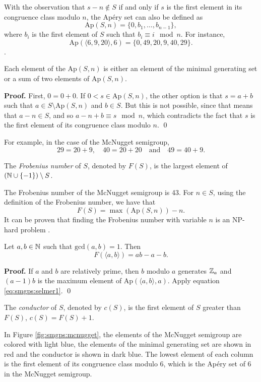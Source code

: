 With the observation that $s - n \notin S$ if and only if $s$ is the first element in its congruence class modulo $n$, the Apéry set can also be defined as  
\[\text{Ap}(S, n) =  \{0, b_1, \ldots, b_{n - 1}\},\]
where $b_i$ is the first element of $S$ such that \(b_i \equiv i \mod n\). 
For instance, \[\text{Ap}(\langle 6, 9, 20 \rangle, 6) = \{0, 49, 20, 9, 40, 29\}.\]. 
\begin{proposition}
    Each element of the $\text{Ap}(S, n)$ is either an element of the minimal generating set or a sum of two elements of $\text{Ap}(S, n)$. 
\end{proposition}
\textbf{Proof. } First, $0 = 0 + 0$. If $0 < s \in \text{Ap}(S, n)$, the other option is that $s = a + b$ such that $a \in S\setminus\text{Ap}(S, n)$ and $b \in S$. But this is not possible, since that means that $a - n \in S$, and so $a - n + b \equiv s \mod n$, which contradicts the fact that $s$ is the first element of its congruence class modulo $n$. \qed \par  
For example, in the case of the McNugget semigroup,
\[29 = 20 + 9, \quad 40 = 20 + 20 \quad \text{and} \quad 49 = 40 + 9.\]
\begin{definition}\label{def:smgps:frobeniusnum}
    The \textit{Frobenius number} of $S$, denoted by $F(S)$, is the largest element of $(\mathbb{N} \cup \{-1\}) \setminus S$.
\end{definition}

The Frobenius number of the McNugget semigroup is 43. For $n \in S$, using the definition of the Frobenius number, we have that
\begin{equation}\label{eq:smgps:selmer1}
    F(S) = \max (\text{Ap}(S, n)) - n.
\end{equation}
It can be proven that finding the Frobenius number with variable $n$ is an NP-hard problem \cite{ramirez1996complexity}.

\begin{proposition} Let $a, b \in \mathbb{N}$ such that $\text{gcd}(a, b) = 1$. Then 
    \[F(\langle a, b \rangle) = ab - a - b.\] 
\end{proposition}
\textbf{Proof. } If $a$ and $b$ are relatively prime, then $b$ modulo $a$ generates $\mathbb{Z}_a$ and $(a - 1)b$ is the maximum element of $\text{Ap}(\langle a, b\rangle, a)$. Apply equation \ref{eq:smgps:selmer1}. \qed

\begin{definition}
    The \textit{conductor} of $S$, denoted by $c(S)$, is the first element of $S$ greater than $F(S)$, $c(S) = F(S) + 1$.
\end{definition}
In Figure \ref{fig:smgps:mcnugget}, the elements of the McNugget semigroup are colored with light blue, the elements of the minimal generating set are shown in red and the conductor is shown in dark blue. The lowest element of each column is the first element of its congruence class modulo 6, which is the Apéry set of 6 in the McNugget semigroup. \par

